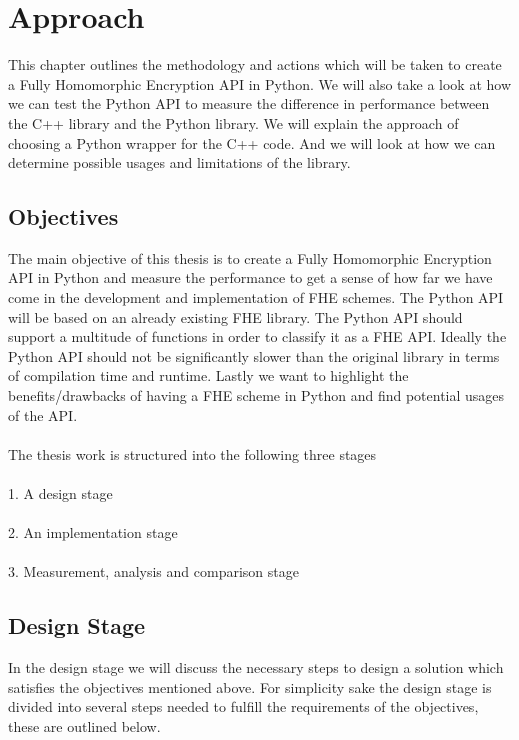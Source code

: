 \chapter{Approach}

This chapter outlines the methodology and actions which will be taken to create a Fully Homomorphic Encryption API in Python. We will also take a look at how we can test the Python API to measure the difference in performance between the C++ library and the Python library. We will explain the approach of choosing a Python wrapper for the C++ code. And we will look at how we can determine possible usages and limitations of the library.





\section{Objectives}

The main objective of this thesis is to create a Fully Homomorphic Encryption API in Python and measure the performance to get a sense of how far we have come in the development and implementation of FHE schemes. The Python API will be based on an already existing FHE library. The Python API should support a multitude of functions in order to classify it as a FHE API. Ideally the Python API should not be significantly slower than the original library in terms of compilation time and runtime. Lastly we want to highlight the benefits/drawbacks of having a FHE scheme in Python and find potential usages of the API.
\\\\
The thesis work is structured into the following three stages
\\\\
1. A design stage\\\\
2. An implementation stage\\\\
3. Measurement, analysis and comparison stage

\section{Design Stage}

In the design stage we will discuss the necessary steps to design a solution which satisfies the objectives mentioned above. For simplicity sake the design stage is divided into several steps needed to fulfill the requirements of the objectives, these are outlined below.
\\\\

